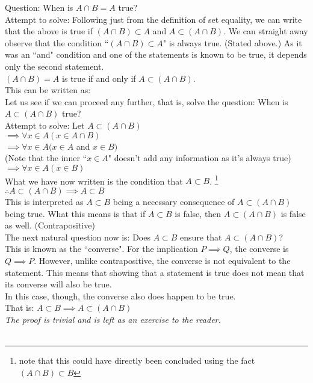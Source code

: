 Question: When is $A\cap B = A$ true?\\
Attempt to solve: Following just from the definition of set equality, we can write that the above is true if $(A\cap B) \subset A$ and $A\subset(A\cap B)$. We can straight away observe that the condition ``$(A\cap B) \subset A$" is always true. (Stated above.) As it was an ``and" condition and one of the statements is known to be true, it depends only the second statement.\\
$(A\cap B) = A$ is true if and only if $A \subset (A\cap B)$.\\
This can be written as:\\
Let us see if we can proceed any further, that is, solve the question: When is $A \subset (A\cap B)$ true?\\
Attempt to solve: Let $A \subset (A\cap B)$\\
$\implies \forall x \in A(x \in A\cap B)$\\
$\implies \forall x \in A(x \in A$ and $x \in B)$\\
\phantom{ }\hfill (Note that the inner ``$x \in A$" doesn't add any information as it's always true)\\
$\implies \forall x \in A(x \in B)$\\
What we have now written is the condition that $A\subset B$.%
\footnote{note that this could have directly been concluded using the fact $(A\cap B)\subset B$}\\
$\therefore A \subset (A\cap B) \implies A \subset B$\\
This is interpreted as $A \subset B$ being a necessary consequence of $A\subset(A\cap B)$ being true. What this means is that if $A \subset B$ is false, then $A \subset (A\cap B)$ is false as well. (Contrapositive)\\
The next natural question now is: Does $A \subset B$ ensure that $A\subset(A\cap B)$?\\
This is known as the ``converse". For the implication $P \implies Q$, the converse is $Q \implies P$. However, unlike contrapositive, the converse is not equivalent to the statement. This means that showing that a statement is true does not mean that its converse will also be true.\\
In this case, though, the converse also does happen to be true.\\
That is: $A\subset B\implies A \subset (A\cap B)$\\
\phantom{ }\hfill\textit{The proof is trivial and is left as an exercise to the reader.}\\~\\


